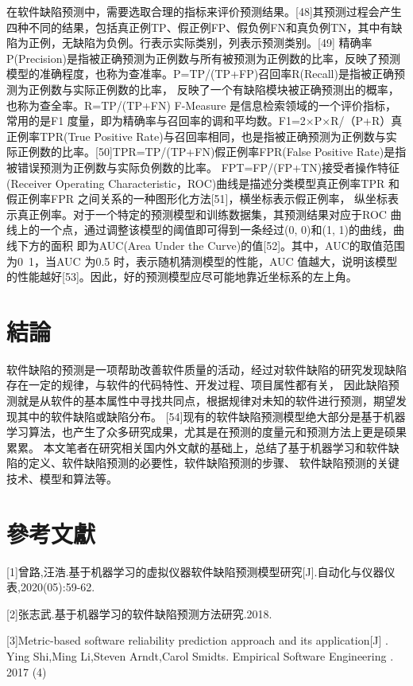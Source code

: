 \documentclass[12pt, a4paper]{article}
\begin{document}
在软件缺陷预测中，需要选取合理的指标来评价预测结果。[48]其预测过程会产生四种不同的结果，包括真正例TP、假正例FP、假负例FN和真负例TN，其中有缺陷为正例，无缺陷为负例。行表示实际类别，列表示预测类别。[49]
精确率P(Precision)是指被正确预测为正例数与所有被预测为正例数的比率，反映了预测模型的准确程度，也称为查准率。P=TP/(TP+FP)召回率R(Recall)是指被正确预测为正例数与实际正例数的比率，
反映了一个有缺陷模块被正确预测出的概率，也称为查全率。R=TP/(TP+FN)   F-Measure 是信息检索领域的一个评价指标，常用的是F1 度量，即为精确率与召回率的调和平均数。F1=2×P×R/（P+R）真
正例率TPR(True Positive Rate)与召回率相同，也是指被正确预测为正例数与实际正例数的比率。[50]TPR=TP/(TP+FN)假正例率FPR(False Positive Rate)是指被错误预测为正例数与实际负例数的比率。
FPT=FP/(FP+TN)接受者操作特征(Receiver Operating Characteristic，ROC)曲线是描述分类模型真正例率TPR 和假正例率FPR 之间关系的一种图形化方法[51]，横坐标表示假正例率，
纵坐标表示真正例率。对于一个特定的预测模型和训练数据集，其预测结果对应于ROC 曲线上的一个点，通过调整该模型的阈值即可得到一条经过(0, 0)和(1, 1)的曲线，曲线下方的面积
即为AUC(Area Under the Curve)的值[52]。其中，AUC的取值范围为0~1，当AUC 为0.5 时，表示随机猜测模型的性能，AUC 值越大，说明该模型的性能越好[53]。因此，好的预测模型应尽可能地靠近坐标系的左上角。

\section{結論}

软件缺陷的预测是一项帮助改善软件质量的活动，经过对软件缺陷的研究发现缺陷存在一定的规律，与软件的代码特性、开发过程、项目属性都有关，
因此缺陷预测就是从软件的基本属性中寻找共同点，根据规律对未知的软件进行预测，期望发现其中的软件缺陷或缺陷分布。
[54]现有的软件缺陷预测模型绝大部分是基于机器学习算法，也产生了众多研究成果，尤其是在预测的度量元和预测方法上更是硕果累累。
本文笔者在研究相关国内外文献的基础上，总结了基于机器学习和软件缺陷的定义、软件缺陷预测的必要性，软件缺陷预测的步骤、
软件缺陷预测的关键技术、模型和算法等。

\section{參考文獻}

[1]曾路,汪浩.基于机器学习的虚拟仪器软件缺陷预测模型研究[J].自动化与仪器仪表,2020(05):59-62.

[2]张志武.基于机器学习的软件缺陷预测方法研究.2018.

[3]Metric-based software reliability prediction approach and its application[J] . Ying Shi,Ming Li,Steven Arndt,Carol Smidts.  Empirical Software Engineering . 2017 (4) 
\end{document}
